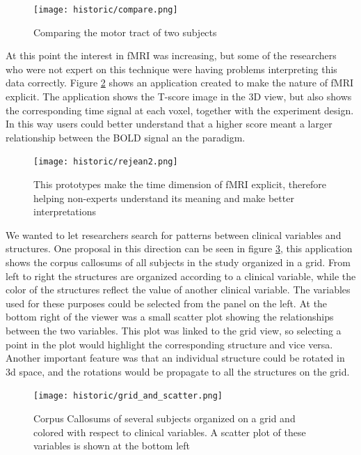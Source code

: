 \begin{figure}
\centering
\texttt{[image: historic/compare.png]} 
\caption{\label{fig_compare_1}Comparing the motor tract of two subjects}
\end{figure}

At this point the interest in fMRI was increasing, but some of the researchers who were not expert on this technique were having problems interpreting this data correctly. Figure \ref{fig_fmri_1} shows an application created to make the nature of fMRI explicit. The application shows the T-score image in the 3D view, but also shows the corresponding time signal at each voxel, together with the experiment design. In this way users could better understand that a higher score meant a larger relationship between the BOLD signal an the paradigm. 

\begin{figure}
\centering
\texttt{[image: historic/rejean2.png]} 
\caption{\label{fig_fmri_1}This prototypes make the time dimension of fMRI explicit, therefore helping non-experts understand its meaning and make better interpretations}
\end{figure}

We wanted to let researchers search for patterns between clinical variables and structures. One proposal in this direction can be seen in figure \ref{fig_grid}, this application shows the corpus callosums of all subjects in the study organized in a grid. From left to right the structures are organized according to a clinical variable, while the color of the structures reflect the value of another clinical variable. The variables used for these purposes could be selected from the panel on the left. At the bottom right of the viewer was a small scatter plot showing the relationships between the two variables. This plot was linked to the grid view, so selecting a point in the plot would highlight the corresponding structure and vice versa. Another important feature was that an individual structure could be rotated in 3d space, and the rotations would be propagate to all the structures on the grid.

\begin{figure}
\centering
\texttt{[image: historic/grid\_and\_scatter.png]} 
\caption{\label{fig_grid}Corpus Callosums of several subjects organized on a grid and colored with respect to clinical variables.
A scatter plot of these variables is shown at the bottom left}
\end{figure}


